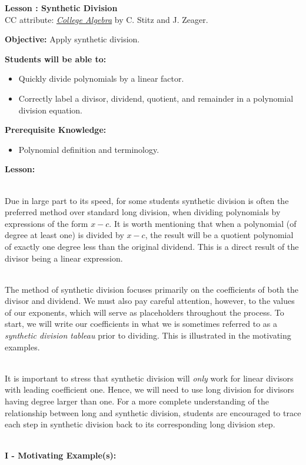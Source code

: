 \documentclass[12pt]{article}
\theoremstyle{definition}
\begin{document}
{\bf \large Lesson : Synthetic Division}
\\ CC attribute: \href{http://www.stitz-zeager.com}{\it{College Algebra}} by C. Stitz and J. Zeager. 
\hfill \doclicenseImage[imagewidth=5em]\\
\par
{\bf Objective:} Apply synthetic division.\\
\par
{\bf Students will be able to:}
\begin{itemize}
	\item Quickly divide polynomials by a linear factor.
	\item Correctly label a divisor, dividend, quotient, and remainder in a polynomial division equation.
\end{itemize}
{\bf Prerequisite Knowledge:}
\begin{itemize}
	\item Polynomial definition and terminology.
\end{itemize}
\hrulefill

{\bf Lesson:}\\
\ \par
Due in large part to its speed, for some students synthetic division is often the preferred method over standard long division, when dividing polynomials by expressions of the form $x-c$.  It is worth mentioning that when a polynomial (of degree at least one) is divided by $x-c$, the result will be a quotient polynomial of exactly one degree less than the original dividend.  This is a direct result of the divisor being a linear expression.\\
\ \par
The method of synthetic division focuses primarily on the coefficients of both the divisor and dividend.  We must also pay careful attention, however, to the values of our exponents, which will serve as placeholders throughout the process.  To start, we will write our coefficients in what we is sometimes referred to as a {\it synthetic division tableau} prior to dividing.  This is illustrated in the motivating examples.\\
\ \par
It is important to stress that synthetic division will {\it only} work for linear divisors with leading coefficient one.  Hence, we will need to use long division for divisors having degree larger than one.  For a more complete understanding of the relationship between long and synthetic division, students are encouraged to trace each step in synthetic division back to its corresponding long division step.\\
\ \par
{\bf I - Motivating Example(s):}\\
\ \par
\end{document}
